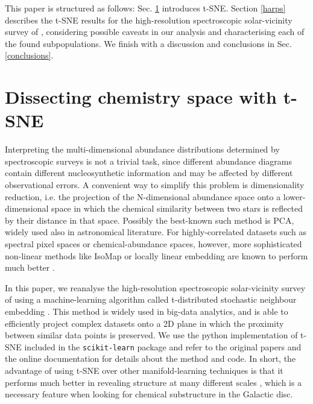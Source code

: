\documentclass{aa}  %
\begin{document}
This paper is structured as follows: Sec. \ref{method} introduces t-SNE. Section \ref{harps} describes the t-SNE results for the high-resolution spectroscopic solar-vicinity survey of \citet{DelgadoMena2017}, considering possible caveats in our analysis and characterising each of the found subpopulations. We finish with a discussion and conclusions in Sec. \ref{conclusions}.

\section{Dissecting chemistry space with t-SNE}\label{method}

Interpreting the multi-dimensional abundance distributions determined by spectroscopic surveys is not a trivial task, since different abundance diagrams contain different nucleosynthetic information and may be affected by different observational errors. A convenient way to simplify this problem is dimensionality reduction, i.e. the projection of the N-dimensional abundance space onto a lower-dimensional space in which the chemical similarity between two stars is reflected by their distance in that space. Possibly the best-known such method is PCA, widely used also in astronomical literature. For highly-correlated datasets such as spectral pixel spaces or chemical-abundance spaces, however, more sophisticated non-linear methods like IsoMap or locally linear embedding are known to perform much better \citep[e.g.][]{Matijevivc2012, Ivezic2013}.

In this paper, we reanalyse the high-resolution spectroscopic solar-vicinity survey of \citet{DelgadoMena2017} using a machine-learning algorithm called t-distributed stochastic neighbour embedding \citep[t-SNE;][]{Hinton2003, vanderMaaten2008}. This method is widely used in big-data analytics, and is able to efficiently project complex datasets onto a 2D plane in which the proximity between similar data points is preserved. We use the python implementation of t-SNE included in the {\tt scikit-learn} package \citep{Pedregosa2012} and refer to the original papers and the online documentation for details about the method and code. In short, the advantage of using t-SNE over other manifold-learning techniques is that it performs much better in revealing structure at many different scales \citep{vanderMaaten2008, Matijevivc2017}, which is a necessary feature when looking for chemical substructure in the Galactic disc.
\end{document}
